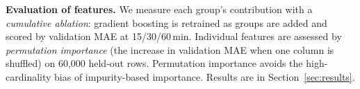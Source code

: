 \textbf{Evaluation of features.} We measure each group's contribution with a
\emph{cumulative ablation}: gradient boosting is retrained as groups are added and
scored by validation MAE at 15/30/60\,min. Individual features are assessed by
\emph{permutation importance} (the increase in validation MAE when one column is
shuffled) on 60,000 held-out rows. Permutation importance avoids the
high-cardinality bias of impurity-based importance. Results are in
Section~\ref{sec:results}.
